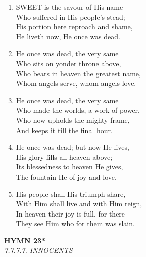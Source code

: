 \documentclass[11pt,a4paper]{article}
\begin{document}
\begin{enumerate}
    \item SWEET is the savour of His name \\
        Who suffered in His people's stead; \\
        His portion here reproach and shame, \\
        He liveth now, He once was dead.

    \item He once was dead, the very same \\
        Who sits on yonder throne above, \\
        Who bears in heaven the greatest name, \\
        Whom angels serve, whom angels love.

    \item He once was dead, the very same \\
        Who made the worlds, a work of power, \\
        Who now upholds the mighty frame, \\
        And keeps it till the final hour.

    \item He once was dead; but now He lives, \\
        His glory fills all heaven above; \\
        Its blessedness to heaven He gives, \\
        The fountain He of joy and love.

    \item His people shall His triumph share, \\
        With Him shall live and with Him reign, \\
        In heaven their joy is full, for there \\
        They see Him who for them was slain.

\end{enumerate}

\newpage
\begin{center}
    {\Large \textbf{HYMN 23*}}
    \\
    \textit{7.7.7.7. INNOCENTS}
\end{center}
\vspace{1em}
\end{document}
